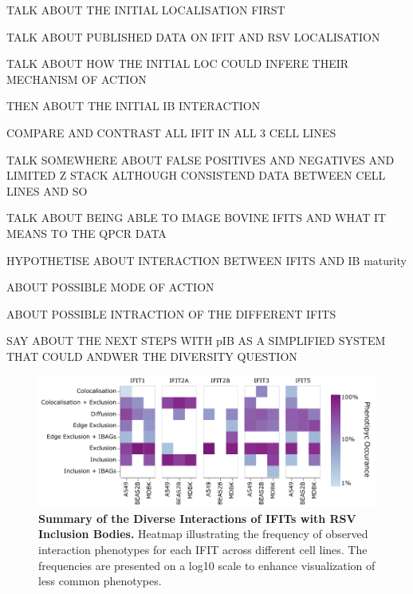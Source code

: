 TALK ABOUT THE INITIAL LOCALISATION FIRST

TALK ABOUT PUBLISHED DATA ON IFIT AND RSV LOCALISATION

TALK ABOUT HOW THE INITIAL LOC COULD INFERE THEIR MECHANISM OF ACTION


THEN ABOUT THE INITIAL IB INTERACTION

COMPARE AND CONTRAST ALL IFIT IN ALL 3 CELL LINES

TALK SOMEWHERE ABOUT FALSE POSITIVES AND NEGATIVES AND LIMITED Z STACK 
ALTHOUGH CONSISTEND DATA BETWEEN CELL LINES AND SO

TALK ABOUT BEING ABLE TO IMAGE BOVINE IFITS AND WHAT IT MEANS TO THE QPCR DATA

HYPOTHETISE ABOUT INTERACTION BETWEEN IFITS AND IB maturity

ABOUT POSSIBLE MODE OF ACTION

ABOUT POSSIBLE INTRACTION OF THE DIFFERENT IFITS



SAY ABOUT THE NEXT STEPS WITH pIB AS A SIMPLIFIED SYSTEM THAT COULD ANDWER THE DIVERSITY QUESTION


\begin{figure}
    \centering
    \includegraphics[width=1\linewidth]{08. Chapter 3/Figs/heatmap_infection.pdf}
    \caption[Summary of the Diverse Interactions of IFITs with RSV Inclusion Bodies.]{\textbf{Summary of the Diverse Interactions of IFITs with RSV Inclusion Bodies.} Heatmap illustrating the frequency of observed interaction phenotypes for each IFIT across different cell lines. The frequencies are presented on a log10 scale to enhance visualization of less common phenotypes.}
    \label{fig:Summary of the Diverse Interactions of IFITs with RSV Inclusion Bodies}
\end{figure}

